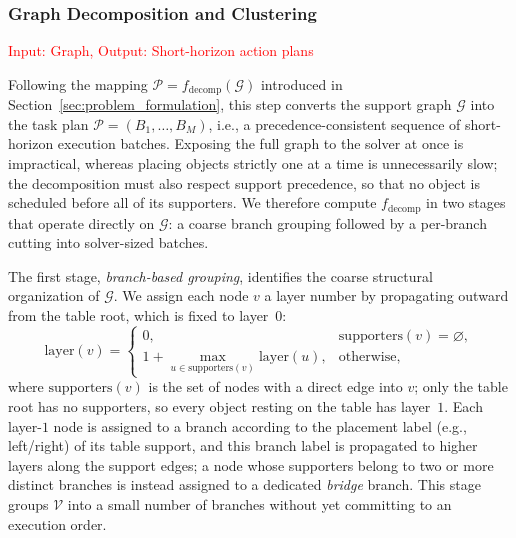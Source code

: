 \documentclass[journal]{IEEEtran}
\begin{document}
\subsubsection{Graph Decomposition and Clustering}
\textcolor{red}{Input: Graph, Output: Short-horizon action plans}

Following the mapping $\mathcal{P}=f_{\mathrm{decomp}}(\mathcal{G})$
introduced in Section~\ref{sec:problem_formulation}, this step converts the
support graph $\mathcal{G}$ into the task plan
$\mathcal{P}=(B_1,\dots,B_M)$, i.e., a precedence-consistent sequence of
short-horizon execution batches. Exposing the full graph to the solver at
once is impractical, whereas placing objects strictly one at a time is
unnecessarily slow; the decomposition must also respect support precedence,
so that no object is scheduled before all of its supporters. We therefore
compute $f_{\mathrm{decomp}}$ in two stages that operate directly on
$\mathcal{G}$: a coarse branch grouping followed by a per-branch cutting
into solver-sized batches.

The first stage, \emph{branch-based grouping}, identifies the coarse
structural organization of $\mathcal{G}$. We assign each node $v$ a layer
number by propagating outward from the table root, which is fixed to
layer~$0$:
\begin{equation}
  \mathrm{layer}(v) =
  \begin{cases}
    0, & \mathrm{supporters}(v)=\varnothing,\\[2pt]
    1 + \displaystyle\max_{u \in \mathrm{supporters}(v)} \mathrm{layer}(u), & \text{otherwise,}
  \end{cases}
  \label{eq:layer}
\end{equation}
where $\mathrm{supporters}(v)$ is the set of nodes with a direct edge into
$v$; only the table root has no supporters, so every object resting on the
table has layer~$1$. Each layer-$1$ node is assigned to a branch according
to the placement label (e.g., left/right) of its table support, and this
branch label is propagated to higher layers along the support edges; a node
whose supporters belong to two or more distinct branches is instead assigned
to a dedicated \emph{bridge} branch. This stage groups $\mathcal{V}$ into a
small number of branches without yet committing to an execution order.
\end{document}
